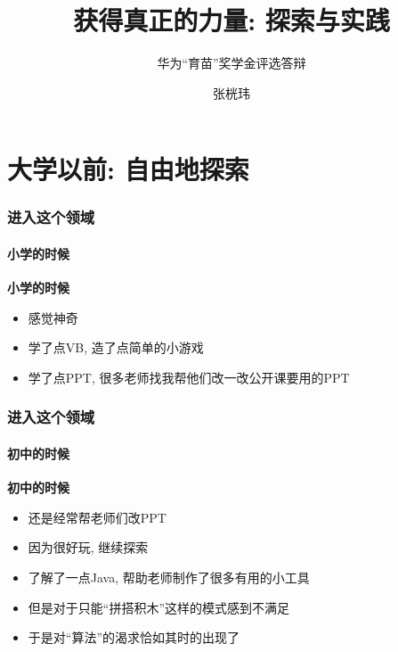 \documentclass[11pt]{beamer}
\begin{document}
	\author{张桄玮}
	\title{获得真正的力量: 探索与实践}
	\subtitle{华为``育苗''奖学金评选答辩}
	\begin{frame}[plain]
		\maketitle
	\end{frame}
	
	\section{大学以前: 自由地探索}
	\begin{frame}
		\frametitle{进入这个领域}
		\framesubtitle{小学的时候}
		\textbf{小学的时候}
		\begin{itemize}
			\item 感觉神奇
			\item 学了点VB, 造了点简单的小游戏
			\item 学了点PPT, 很多老师找我帮他们改一改公开课要用的PPT
		\end{itemize} 
	\end{frame}


	\begin{frame}
		\frametitle{进入这个领域}
		\framesubtitle{初中的时候}
		\textbf{初中的时候}
		\begin{itemize}
			\item 还是经常帮老师们改PPT
			\item 因为很好玩, 继续探索
			\item 了解了一点Java, 帮助老师制作了很多有用的小工具
				\item 但是对于只能``拼搭积木''这样的模式感到不满足
			\item 于是对``算法''的渴求恰如其时的出现了
		\end{itemize} 
	\end{frame}
\end{document}
